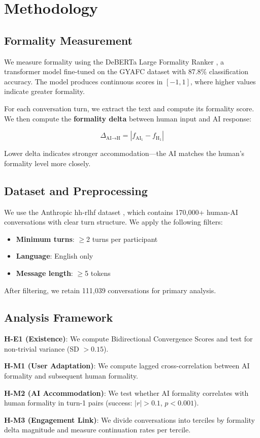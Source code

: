 \section{Methodology}

\subsection{Formality Measurement}

We measure formality using the DeBERTa Large Formality Ranker \citep{deberta2024formality}, a transformer model fine-tuned on the GYAFC dataset with 87.8\% classification accuracy. The model produces continuous scores in $[-1, 1]$, where higher values indicate greater formality.

For each conversation turn, we extract the text and compute its formality score. We then compute the \textbf{formality delta} between human input and AI response:

\begin{equation}
\Delta_{\text{AI}\to\text{H}} = |f_{\text{AI}_1} - f_{\text{H}_1}|
\end{equation}

Lower delta indicates stronger accommodation---the AI matches the human's formality level more closely.

\subsection{Dataset and Preprocessing}

We use the Anthropic hh-rlhf dataset \citep{anthropic2022hh}, which contains 170,000+ human-AI conversations with clear turn structure. We apply the following filters:

\begin{itemize}
    \item \textbf{Minimum turns}: $\geq$2 turns per participant
    \item \textbf{Language}: English only
    \item \textbf{Message length}: $\geq$5 tokens
\end{itemize}

After filtering, we retain 111,039 conversations for primary analysis.

\subsection{Analysis Framework}

\textbf{H-E1 (Existence)}: We compute Bidirectional Convergence Scores and test for non-trivial variance (SD $> 0.15$).

\textbf{H-M1 (User Adaptation)}: We compute lagged cross-correlation between AI formality and subsequent human formality.

\textbf{H-M2 (AI Accommodation)}: We test whether AI formality correlates with human formality in turn-1 pairs (success: $|r| > 0.1$, $p < 0.001$).

\textbf{H-M3 (Engagement Link)}: We divide conversations into terciles by formality delta magnitude and measure continuation rates per tercile.
